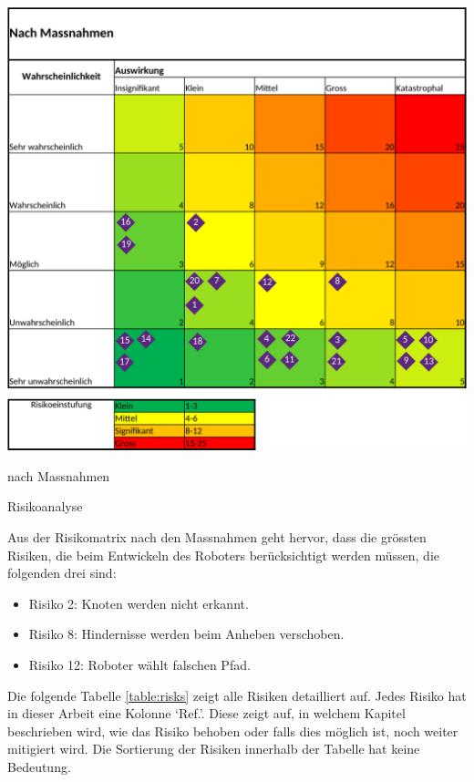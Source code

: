 \begin{table}[H]
\begin{subtable}{0.49\textwidth}
\includegraphics[width=0.99\linewidth]{assets/projektmanagement/Risikoanalyse_nachher-crop.pdf}
\caption{nach Massnahmen}
\label{table:risk-after}
\end{subtable}
\caption{Risikoanalyse}
\label{table:risk-table}
\end{table}

Aus der Risikomatrix nach den Massnahmen geht hervor, dass die grössten Risiken, die beim Entwickeln des Roboters berücksichtigt werden müssen, die folgenden drei sind:

\begin{itemize}
    \item Risiko 2: Knoten werden nicht erkannt.
    \item Risiko 8: Hindernisse werden beim Anheben verschoben.
    \item Risiko 12: Roboter wählt falschen Pfad.
\end{itemize}

Die folgende Tabelle \ref{table:risks} zeigt alle Risiken detailliert auf.  Jedes Risiko hat in dieser Arbeit eine Kolonne `Ref.'. Diese zeigt auf, in welchem Kapitel beschrieben wird, wie das Risiko behoben oder falls dies möglich ist, noch weiter mitigiert wird. Die Sortierung der Risiken innerhalb der Tabelle hat keine Bedeutung.

